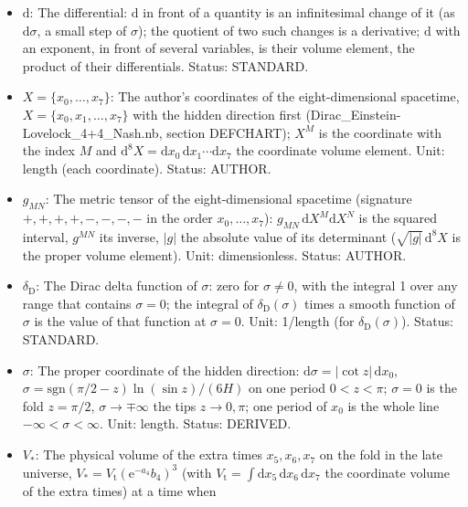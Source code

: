 \documentclass[
  10pt,
]{article}
\providecommand{\tightlist}{%
  \setlength{\itemsep}{0pt}\setlength{\parskip}{0pt}}
\begin{document}
\begin{itemize}
\tightlist
\item
  \(\mathrm{d}\): The differential: \(\mathrm{d}\) in front of a
  quantity is an infinitesimal change of it (as \(\mathrm{d}\sigma\), a
  small step of \(\sigma\)); the quotient of two such changes is a
  derivative; \(\mathrm{d}\) with an exponent, in front of several
  variables, is their volume element, the product of their
  differentials. Status: STANDARD.
\item
  \(X = \{x_0, \dots, x_7\}\): The author's coordinates of the
  eight-dimensional spacetime, \(X = \{x_0, x_1, \dots, x_7\}\) with the
  hidden direction first (Dirac\_Einstein-Lovelock\_4+4\_Nash.nb,
  section DEFCHART); \(X^M\) is the coordinate with the index \(M\) and
  \(\mathrm{d}^8X = \mathrm{d}x_0\,\mathrm{d}x_1\cdots\mathrm{d}x_7\)
  the coordinate volume element. Unit: length (each coordinate). Status:
  AUTHOR.
\item
  \(g_{MN}\): The metric tensor of the eight-dimensional spacetime
  (signature \(+,+,+,+,-,-,-,-\) in the order \(x_0, \dots, x_7\)):
  \(g_{MN}\,\mathrm{d}X^M\mathrm{d}X^N\) is the squared interval,
  \(g^{MN}\) its inverse, \(\lvert g\rvert\) the absolute value of its
  determinant (\(\sqrt{\lvert g\rvert}\,\mathrm{d}^8X\) is the proper
  volume element). Unit: dimensionless. Status: AUTHOR.
\item
  \(\delta_{\mathrm{D}}\): The Dirac delta function of \(\sigma\): zero
  for \(\sigma \ne 0\), with the integral 1 over any range that contains
  \(\sigma = 0\); the integral of \(\delta_{\mathrm{D}}(\sigma)\) times
  a smooth function of \(\sigma\) is the value of that function at
  \(\sigma = 0\). Unit: 1/length (for \(\delta_{\mathrm{D}}(\sigma)\)).
  Status: STANDARD.
\item
  \(\sigma\): The proper coordinate of the hidden direction:
  \(\mathrm{d}\sigma = \lvert\cot z\rvert\,\mathrm{d}x_0\),
  \(\sigma = \mathrm{sgn}(\pi/2 - z)\ln(\sin z)/(6H)\) on one period
  \(0 < z < \pi\); \(\sigma = 0\) is the fold \(z = \pi/2\),
  \(\sigma \to \mp\infty\) the tips \(z \to 0, \pi\); one period of
  \(x_0\) is the whole line \(-\infty < \sigma < \infty\). Unit: length.
  Status: DERIVED.
\item
  \(V_*\): The physical volume of the extra times \(x_5, x_6, x_7\) on
  the fold in the late universe,
  \(V_* = V_{\mathrm{t}}(\mathrm{e}^{-a_4}b_4)^3\) (with
  \(V_{\mathrm{t}} = \int\mathrm{d}x_5\,\mathrm{d}x_6\,\mathrm{d}x_7\)
  the coordinate volume of the extra times) at a time when

\end{itemize}
\end{document}
